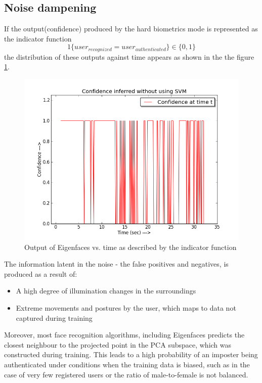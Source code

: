 \documentclass[%
        final,
        internal,
        notitlepage,
        narroweqnarray,
        inline,
        ]{ieee}
\begin{document}
\subsection{Noise dampening}
If the output(confidence) produced by the hard biometrics mode is represented as the indicator function
\begin{equation}
1\{user_{recognized} = user_{authenticated}\} \in \{0,1\}
\end{equation}
the distribution of these outputs against time appears as shown in the the figure \ref{fig:no_svm}.
\begin{figure}[h!]
	\centering
	\includegraphics[scale=0.4]{img/no_svm.png}
	\caption{Output of Eigenfaces vs. time as described by the indicator function}
	\label{fig:no_svm}
\end{figure}
The information latent in the noise - the false positives and negatives, is produced as a result of:
\begin{itemize}
	\item A high degree of illumination changes in the surroundings
	\item Extreme movements and postures by the user, which maps to data not captured during training
\end{itemize}
Moreover, most face recognition algorithms, including Eigenfaces predicts the closest neighbour to the projected point in the PCA subspace, which was constructed during training.
This leads to a high probability of an imposter being authenticated under conditions when the training data is biased, such as in the case of very few registered users or the ratio of male-to-female is not balanced.\\
\end{document}
